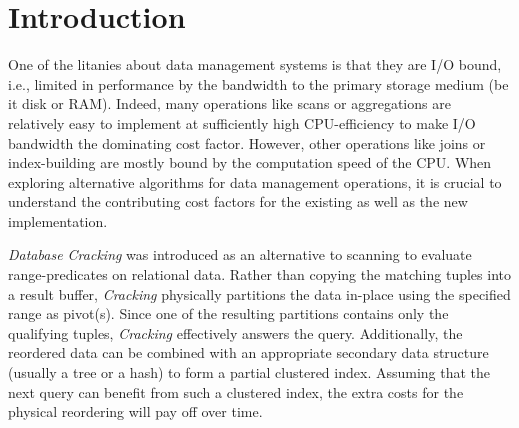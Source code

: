 \section{Introduction}
\label{sec:introduction}
One of the litanies about data management systems is that they are I/O
bound, i.e., limited in performance by the bandwidth to the primary
storage medium (be it disk or RAM). Indeed, many operations like scans
or aggregations are relatively easy to implement at sufficiently high
CPU-efficiency to make I/O bandwidth the dominating cost
factor. However, other operations like joins or index-building are
mostly bound by the computation speed of the CPU. When exploring
alternative algorithms for data management operations, it is crucial
to understand the contributing cost factors for the existing as well
as the new implementation.

\emph{Database Cracking} was introduced as an alternative to scanning
 to evaluate range-predicates on relational data. Rather than
copying the matching tuples into a result buffer, \emph{Cracking}
physically partitions the data in-place using the specified
range as pivot(s). Since one of the resulting partitions contains only the
qualifying tuples, \emph{Cracking} effectively answers the query. 
Additionally,
the reordered data can be combined with an appropriate
secondary data structure (usually a tree or a hash) to form a partial
clustered index. Assuming that the next query can benefit from such a
clustered index, the extra costs for the physical reordering will pay
off over time. 


